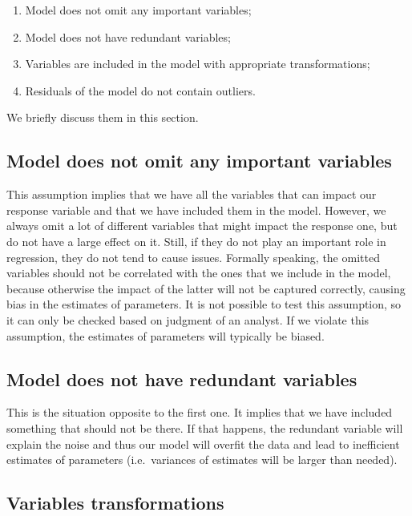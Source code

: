 \documentclass[
]{book}
\providecommand{\tightlist}{%
  \setlength{\itemsep}{0pt}\setlength{\parskip}{0pt}}
\begin{document}
\begin{enumerate}
\def\labelenumi{\arabic{enumi}.}
\tightlist
\item
  Model does not omit any important variables;
\item
  Model does not have redundant variables;
\item
  Variables are included in the model with appropriate transformations;
\item
  Residuals of the model do not contain outliers.
\end{enumerate}

We briefly discuss them in this section.

\hypertarget{model-does-not-omit-any-important-variables}{%
\subsection{Model does not omit any important variables}\label{model-does-not-omit-any-important-variables}}

This assumption implies that we have all the variables that can impact our response variable and that we have included them in the model. However, we always omit a lot of different variables that might impact the response one, but do not have a large effect on it. Still, if they do not play an important role in regression, they do not tend to cause issues. Formally speaking, the omitted variables should not be correlated with the ones that we include in the model, because otherwise the impact of the latter will not be captured correctly, causing bias in the estimates of parameters. It is not possible to test this assumption, so it can only be checked based on judgment of an analyst. If we violate this assumption, the estimates of parameters will typically be biased.

\hypertarget{model-does-not-have-redundant-variables}{%
\subsection{Model does not have redundant variables}\label{model-does-not-have-redundant-variables}}

This is the situation opposite to the first one. It implies that we have included something that should not be there. If that happens, the redundant variable will explain the noise and thus our model will overfit the data and lead to inefficient estimates of parameters (i.e.~variances of estimates will be larger than needed).

\hypertarget{variables-transformations}{%
\subsection{Variables transformations}\label{variables-transformations}}
\end{document}

